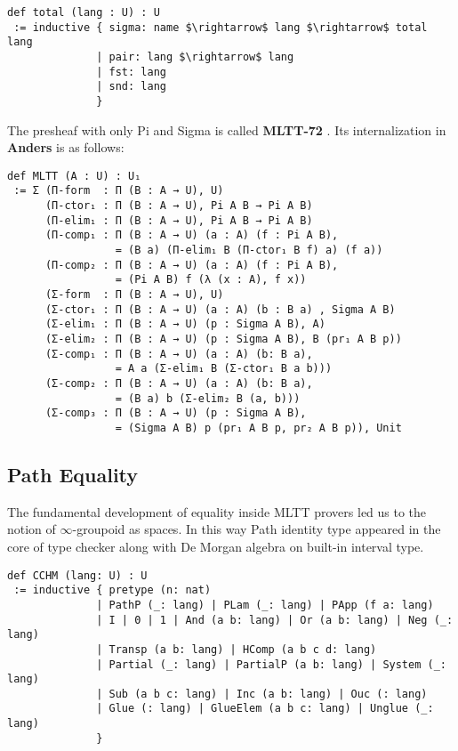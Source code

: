 \documentclass{article}
\theoremstyle{definition}
\begin{document}
\begin{lstlisting}[mathescape=true]
def total (lang : U) : U
 := inductive { sigma: name $\rightarrow$ lang $\rightarrow$ total lang
              | pair: lang $\rightarrow$ lang
              | fst: lang
              | snd: lang
              }
\end{lstlisting}

The presheaf with only Pi and Sigma is called \textbf{MLTT-72} \cite{MLTT72}.
Its internalization in \textbf{Anders} is as follows:

\begin{lstlisting}[mathescape=true]
def MLTT (A : U) : U₁
 := Σ (Π-form  : Π (B : A → U), U)
      (Π-ctor₁ : Π (B : A → U), Pi A B → Pi A B)
      (Π-elim₁ : Π (B : A → U), Pi A B → Pi A B)
      (Π-comp₁ : Π (B : A → U) (a : A) (f : Pi A B),
                 = (B a) (Π-elim₁ B (Π-ctor₁ B f) a) (f a))
      (Π-comp₂ : Π (B : A → U) (a : A) (f : Pi A B),
                 = (Pi A B) f (λ (x : A), f x))
      (Σ-form  : Π (B : A → U), U)
      (Σ-ctor₁ : Π (B : A → U) (a : A) (b : B a) , Sigma A B)
      (Σ-elim₁ : Π (B : A → U) (p : Sigma A B), A)
      (Σ-elim₂ : Π (B : A → U) (p : Sigma A B), B (pr₁ A B p))
      (Σ-comp₁ : Π (B : A → U) (a : A) (b: B a),
                 = A a (Σ-elim₁ B (Σ-ctor₁ B a b)))
      (Σ-comp₂ : Π (B : A → U) (a : A) (b: B a),
                 = (B a) b (Σ-elim₂ B (a, b)))
      (Σ-comp₃ : Π (B : A → U) (p : Sigma A B),
                 = (Sigma A B) p (pr₁ A B p, pr₂ A B p)), Unit
\end{lstlisting}

\newpage
\subsection{Path Equality}

The fundamental development of equality inside MLTT provers led us to the
notion of $\infty$-groupoid as spaces. In this way Path identity type appeared
in the core of type checker along with De Morgan algebra on built-in interval type.

\begin{lstlisting}[mathescape=true]
def CCHM (lang: U) : U
 := inductive { pretype (n: nat)
              | PathP (_: lang) | PLam (_: lang) | PApp (f a: lang)
              | I | 0 | 1 | And (a b: lang) | Or (a b: lang) | Neg (_: lang)
              | Transp (a b: lang) | HComp (a b c d: lang)
              | Partial (_: lang) | PartialP (a b: lang) | System (_: lang)
              | Sub (a b c: lang) | Inc (a b: lang) | Ouc (: lang)
              | Glue (: lang) | GlueElem (a b c: lang) | Unglue (_: lang)
              }
\end{lstlisting}
\end{document}
